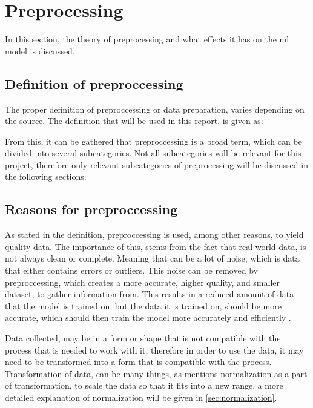 \section{Preprocessing}
In this section, the theory of preprocessing and what effects it has on the \gls{ml} model is discussed.



\subsection{Definition of preproccessing}\label{subsec:preprocessing-definition}
The proper definition of preproccessing or data preparation, varies depending on the source. The definition that will be used in this report, is given as:


From this, it can be gathered that preproccessing is a broad term, which can be divided into several subcategories. Not all subcategories will be relevant for this project, therefore only relevant subcategories of preprocessing will be discussed in the following sections.
  

\subsection{Reasons for preproccessing}
As stated in the definition, preproccessing is used, among other reasons, to yield quality data. The importance of this, stems from the fact that real world data, is not always clean or complete. Meaning that can be a lot of noise, which is data that either contains errors or outliers. This noise can be removed by preproccessing, which creates a more accurate, higher quality, and smaller dataset, to gather information from. This results in a reduced amount of data that the model is trained on, but the data it is trained on, should be more accurate, which should then train the model more accurately and efficiently \cite{doi:10.1080/713827180}.

  

Data collected, may be in a form or shape that is not compatible with the process that is needed to work with it, therefore in order to use the data, it may need to be transformed into a form that is compatible with the process. Transformation of data, can be many things, as \cite{Data-preprocessing-for-flight-delays} mentions normalization as a part of transformation, to scale the data so that it fits into a new range, a more detailed explanation of normalization will be given in \ref{sec:normalization}.

